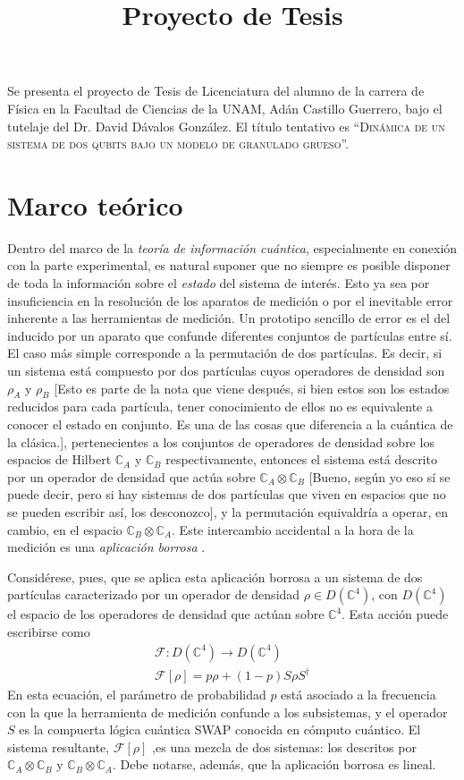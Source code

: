 \documentclass[onecolumn,11pt]{article}
\title{Proyecto de Tesis} \date{}
\newcommand{\mcF}{\mathcal{F}}
\newcommand{\Hh}{\mathbb{C}} %
\newcommand{\nota}[1]{{\color{red} [#1]}}
\newcommand{\notaAd}[1]{{\color{blue} [#1]}} %
\begin{document}
\maketitle
\thispagestyle{empty}
Se presenta el proyecto de Tesis de Licenciatura del alumno de la carrera de Física en la Facultad de Ciencias de la UNAM, Adán Castillo Guerrero, bajo el tutelaje del Dr. David Dávalos González. El título tentativo es ``\textsc{Dinámica de un sistema de dos qubits bajo un modelo de granulado grueso}''.

\section{Marco teórico}


Dentro del marco de la \textit{teoría de información cuántica}, especialmente en conexión con la parte experimental, es natural suponer que no siempre es posible disponer de toda la información sobre el \textit{estado} del sistema de interés. Esto ya sea por insuficiencia en la resolución de los aparatos de medición o por el inevitable error inherente a las herramientas de medición. Un prototipo sencillo de error es el del inducido por un aparato que confunde diferentes conjuntos de partículas entre sí. El caso más simple corresponde a la permutación de dos partículas. Es decir, si un sistema está compuesto por dos partículas cuyos operadores de densidad son $\rho_{A}$ y $\rho_{B}$ \nota{Esto es parte de la nota que viene después, si bien estos son los estados reducidos para cada partícula, tener conocimiento de ellos no es equivalente a conocer el estado en conjunto. Es una de las cosas que diferencia a la cuántica de la clásica.}, pertenecientes a los conjuntos de operadores de densidad sobre los espacios de Hilbert $\Hh_{A}$ y $\Hh_{B}$ respectivamente, entonces el sistema está descrito por un operador de densidad que actúa sobre $\Hh_{A}\otimes\Hh_{B}$ \notaAd{Bueno, según yo eso sí se puede decir, pero si hay sistemas de dos partículas que viven en espacios que no se pueden escribir así, los desconozco}, y la permutación equivaldría a operar, en cambio, en el espacio $\Hh_{B}\otimes\Hh_{A}$. Este intercambio accidental a la hora de la medición es una \textit{aplicación borrosa} \cite{FuzzyMeasurements}.

Considérese, pues, que se aplica esta aplicación borrosa a un sistema de dos partículas caracterizado por un operador de densidad $\rho\in D(\Hh^{4})$, con $D(\Hh^{4})$ el espacio de los operadores de densidad que actúan sobre $\Hh^{4}$. Esta acción puede escribirse como
\begin{gather}
\mcF:D(\Hh^{4})\rightarrow D(\Hh^{4})\label{eq:Fuzzy2Domain}\\
\mcF[\rho]=p\rho+(1-p)S\rho S^{\dag}\label{eq:Fuzzy2}
\end{gather}
En esta ecuación, el parámetro  de probabilidad $p$ está asociado a la frecuencia con la que la herramienta de medición confunde a los subsistemas, y el operador $S$ es la compuerta lógica cuántica SWAP conocida en cómputo cuántico. El sistema resultante, $\mcF[\rho]$ ,es una mezcla de dos sistemas: los descritos por $\Hh_{A}\otimes\Hh_{B}$ y $\Hh_{B}\otimes\Hh_{A}$. Debe notarse, además, que la aplicación borrosa es lineal.
\end{document}
